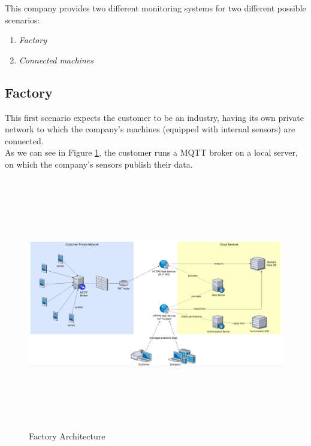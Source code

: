 \documentclass[12pt]{report}
\begin{document}
{This company provides two different monitoring systems for two different possible scenarios:
\bigskip
\begin{enumerate}
\setlength{\itemindent}{+5mm}
\item \emph{Factory}
\item \emph{Connected machines}
\end{enumerate}

\clearpage
\subsection{Factory}
\bigskip

This first scenario expects the customer to be an industry, having its own private network to which the company's machines (equipped with internal sensors) are connected.\\
As we can see in Figure \ref{fig:factoryarchitecture}, the customer runs a MQTT broker on a local server, on which the company's sensors publish their data.\\

\begin{figure}[H]
\includegraphics[width=15cm,height=11cm,keepaspectratio]{factory_architecture}
\centering
\caption{Factory Architecture}
\label{fig:factoryarchitecture}
\end{figure}

}
\end{document}
